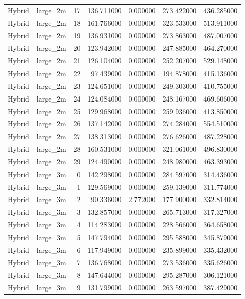 \begin{tabular}{llrrrrr}
Hybrid & large_2m & 17 & 136.711000 & 0.000000 & 273.422000 & 436.285000 \\
Hybrid & large_2m & 18 & 161.766000 & 0.000000 & 323.533000 & 513.911000 \\
Hybrid & large_2m & 19 & 136.931000 & 0.000000 & 273.863000 & 487.007000 \\
Hybrid & large_2m & 20 & 123.942000 & 0.000000 & 247.885000 & 464.270000 \\
Hybrid & large_2m & 21 & 126.104000 & 0.000000 & 252.207000 & 529.148000 \\
Hybrid & large_2m & 22 & 97.439000 & 0.000000 & 194.878000 & 415.136000 \\
Hybrid & large_2m & 23 & 124.651000 & 0.000000 & 249.303000 & 410.755000 \\
Hybrid & large_2m & 24 & 124.084000 & 0.000000 & 248.167000 & 469.606000 \\
Hybrid & large_2m & 25 & 129.968000 & 0.000000 & 259.936000 & 413.850000 \\
Hybrid & large_2m & 26 & 137.142000 & 0.000000 & 274.284000 & 554.510000 \\
Hybrid & large_2m & 27 & 138.313000 & 0.000000 & 276.626000 & 487.228000 \\
Hybrid & large_2m & 28 & 160.531000 & 0.000000 & 321.061000 & 496.830000 \\
Hybrid & large_2m & 29 & 124.490000 & 0.000000 & 248.980000 & 463.393000 \\
Hybrid & large_3m & 0 & 142.298000 & 0.000000 & 284.597000 & 314.436000 \\
Hybrid & large_3m & 1 & 129.569000 & 0.000000 & 259.139000 & 311.774000 \\
Hybrid & large_3m & 2 & 90.336000 & 2.772000 & 177.900000 & 332.814000 \\
Hybrid & large_3m & 3 & 132.857000 & 0.000000 & 265.713000 & 317.327000 \\
Hybrid & large_3m & 4 & 114.283000 & 0.000000 & 228.566000 & 364.658000 \\
Hybrid & large_3m & 5 & 147.794000 & 0.000000 & 295.588000 & 345.879000 \\
Hybrid & large_3m & 6 & 117.949000 & 0.000000 & 235.899000 & 335.432000 \\
Hybrid & large_3m & 7 & 136.768000 & 0.000000 & 273.536000 & 335.626000 \\
Hybrid & large_3m & 8 & 147.644000 & 0.000000 & 295.287000 & 306.121000 \\
Hybrid & large_3m & 9 & 131.799000 & 0.000000 & 263.597000 & 387.429000 \\

\end{tabular}
